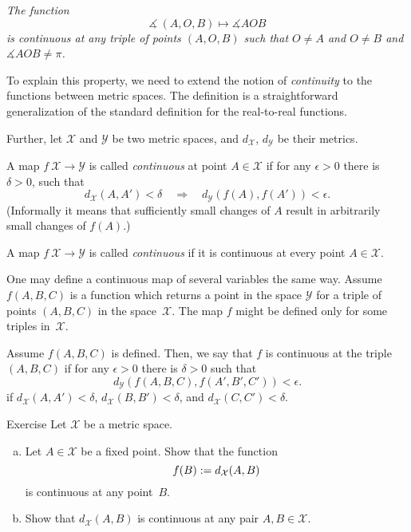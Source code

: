 \textit{The function}
$$\measuredangle\:(A,O,B)\mapsto\measuredangle A O B$$
\textit{is continuous at any triple of points $(A,O,B)$
such that $O\ne A$ and $O\ne B$ and $\measuredangle A O B\ne\pi$.}

To explain this property, we need to extend the notion of {}\emph{continuity} to the functions between metric spaces.
The definition is a straightforward generalization of the standard definition for the real-to-real functions.

Further, let $\mathcal X$ and $\mathcal Y$ be two metric spaces,
and $d_{\mathcal X}$, $d_{\mathcal Y}$ be their metrics.

A map $f\:\mathcal X\to\mathcal Y$ is called \emph{continuous} at point $A\in \mathcal X$
if for any $\epsilon>0$ there is $\delta>0$, such that 
\[d_{\mathcal X}(A,A')
<
\delta
\quad
\Rightarrow
\quad
d_{\mathcal Y}(f(A),f(A'))
<
\epsilon.\]
(Informally it means that sufficiently small changes of $A$ result in arbitrarily small changes of $f(A)$.)

A map $f\:\mathcal X\to\mathcal Y$ is called \emph{continuous} if it is continuous at every point $A\in \mathcal X$.

One may define a continuous map of several variables the same way.
Assume $f(A,B,C)$ is a function which returns a point in the space $\mathcal Y$ for a triple of points $(A,B,C)$
in the space~$\mathcal X$.
The map $f$ might be defined only for some triples in~$\mathcal X$.

Assume $f(A,B,C)$ is defined.
Then, we say that $f$ is continuous at the triple $(A,B,C)$ 
if for any $\epsilon>0$ there is $\delta>0$ such that 
\[d_{\mathcal Y}(f(A,B,C),f(A',B',C'))<\epsilon.\]
if $d_{\mathcal X}(A,A')<\delta$, $d_{\mathcal X}(B,B')<\delta$, and $d_{\mathcal X}(C,C')<\delta$.


\begin{thm}{Exercise}\label{ex:dist-cont}
Let $\mathcal{X}$ be a metric space.
\begin{enumerate}[(a)]
\item\label{ex:dist-cont:a} Let $A\in \mathcal{X}$ be a fixed point.
Show that the function 
$$f(B):=
d_{\mathcal{X}}(A,B)$$ 
is continuous at any point~$B$.
\item Show that $d_{\mathcal{X}}(A,B)$ is continuous at any pair $A,B\in \mathcal{X}$.
\end{enumerate}

\end{thm}

